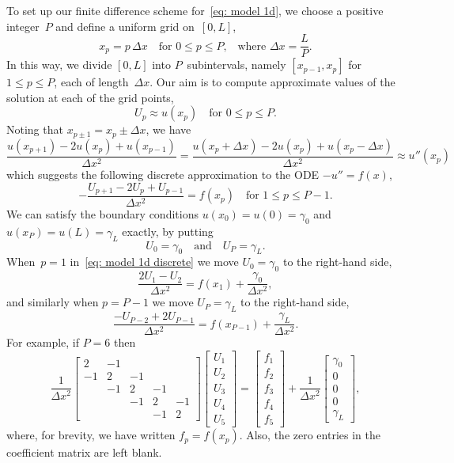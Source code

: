 To set up our finite difference scheme for~\eqref{eq: model 1d}, we choose a 
positive integer~$P$ and define a uniform grid on~$[0,L]$,
\[
x_p=p\,\Delta x\quad\text{for $0\le p\le P$,}
	\quad\text{where $\Delta x=\frac{L}{P}$.}
\]
In this way, we divide $[0,L]$ into $P$~subintervals, namely $[x_{p-1},x_p]$
for~$1\le p\le P$, each of length~$\Delta x$.  Our aim is to compute 
approximate values of the solution at each of the grid points,
\[
U_p\approx u(x_p)\quad\text{for $0\le p\le P$.}
\]
Noting that $x_{p\pm1}=x_p\pm\Delta x$, we have
\begin{equation}\label{eq: u'' approx}
\frac{u(x_{p+1})-2u(x_p)+u(x_{p-1})}{\Delta x^2}
	=\frac{u(x_p+\Delta x)-2u(x_p)+u(x_p-\Delta x)}{\Delta x^2}
	\approx u''(x_p)
\end{equation}
which suggests the following discrete approximation to the ODE $-u''=f(x)$,
\begin{equation}\label{eq: model 1d discrete}
-\frac{U_{p+1}-2U_p+U_{p-1}}{\Delta x^2}=f(x_p)\quad\text{for $1\le p\le P-1$.}
\end{equation}
We can satisfy the boundary conditions $u(x_0)=u(0)=\gamma_0$ and 
$u(x_P)=u(L)=\gamma_L$ exactly, by putting
\[
U_0=\gamma_0\quad\text{and}\quad U_P=\gamma_L.
\]
When~$p=1$ in~\eqref{eq: model 1d discrete} we move $U_0=\gamma_0$ to the 
right-hand side, 
\[
\frac{2U_1-U_2}{\Delta x^2}=f(x_1)+\frac{\gamma_0}{\Delta x^2},
\]
and similarly when $p=P-1$ we move $U_P=\gamma_L$ to the right-hand side,
\[
\frac{-U_{P-2}+2U_{P-1}}{\Delta x^2}=f(x_{P-1})+\frac{\gamma_L}{\Delta x^2}.
\]
For example, if $P=6$ then
\begin{equation}\label{eq: model 1d linear system}
\frac{1}{\Delta x^2}\begin{bmatrix}
 2&-1&  & &\\
-1& 2&-1& &\\
  &-1& 2&-1&\\
  &  &-1& 2&-1\\
  &  &  &-1& 2
\end{bmatrix}
\begin{bmatrix}U_1\\ U_2\\ U_3\\ U_4\\ U_5\end{bmatrix}
=\begin{bmatrix}f_1\\ f_2\\ f_3\\ f_4\\ f_5 \end{bmatrix}
+\frac{1}{\Delta x^2}
\begin{bmatrix}\gamma_0\\ 0\\ 0 \\ 0\\ \gamma_L \end{bmatrix},
\end{equation}
where, for brevity, we have written $f_p=f(x_p)$.  Also, the zero entries in 
the coefficient matrix are left blank.

